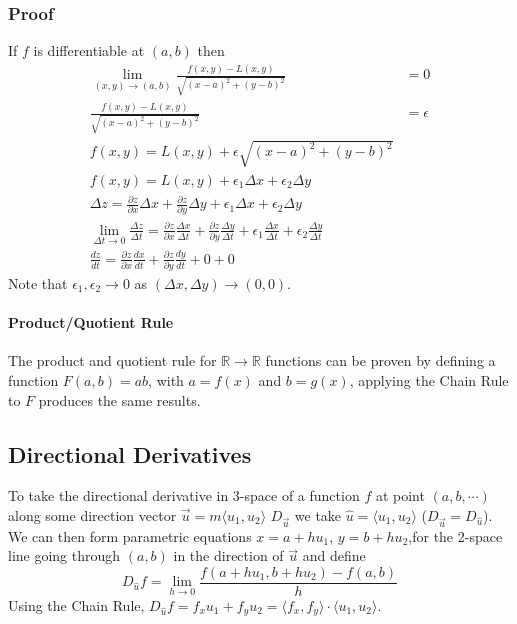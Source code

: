 \documentclass{article}
\newcommand{\vect}[1]{\ensuremath{\overrightarrow{#1}}}
\begin{document}
\subsubsection{Proof}
If $f$ is differentiable at $(a,b)$ then
\begin{align*}
    \lim_{(x,y)\to(a,b)} \frac{f(x,y)-L(x,y)}{\sqrt{(x-a)^2+(y-b)^2}}&=0\\
    \frac{f(x,y)-L(x,y)}{\sqrt{(x-a)^2+(y-b)^2}}&=\epsilon\\
    f(x,y) = L(x,y) + \epsilon\sqrt{(x-a)^2+(y-b)^2}\\
    f(x,y) = L(x,y) + \epsilon_1\Delta{x} + \epsilon_2\Delta{y} \\
    \Delta{z} = \frac{\partial{z}}{\partial{x}}\Delta{x} + \frac{\partial{z}}{\partial{y}}\Delta{y} + \epsilon_1\Delta{x} + \epsilon_2\Delta{y}\\
    \lim_{\Delta{t}\to0} \frac{\Delta{z}}{\Delta{t}} = \frac{\partial{z}}{\partial{x}}\frac{\Delta{x}}{\Delta{t}} + \frac{\partial{z}}{\partial{y}}\frac{\Delta{y}}{\Delta{t}} + \epsilon_1\frac{\Delta{x}}{\Delta{t}} + \epsilon_2\frac{\Delta{y}}{\Delta{t}}\\
    \frac{dz}{dt}=\frac{\partial z}{\partial x}\frac{dx}{dt}+\frac{\partial z}{\partial y}\frac{dy}{dt}+0+0
\end{align*}
Note that $\epsilon_1, \epsilon_2\to0$ as $(\Delta{x},\Delta{y})\to(0,0)$.

\paragraph{Product/Quotient Rule} The product and quotient rule for $\mathbb{R}\to\mathbb{R}$ functions can be proven by defining a function $F(a,b)=ab$, with $a=f(x)$ and $b=g(x)$, applying the Chain Rule to $F$ produces the same results.

\subsection{Directional Derivatives}
To take the directional derivative in 3-space of a function $f$ at point $(a,b,\cdots)$ along some direction vector $\vect{u}=m\langle u_1, u_2\rangle$ $D_{\vect{u}}$ we take $\hat{u}=\langle u_1, u_2\rangle$ ($D_{\vect{u}} = D_{\hat{u}}$). We can then form parametric equations $x=a+hu_1$, $y=b+hu_2$,for the 2-space line going through $(a,b)$ in the direction of \vect{u} and define
$$D_{\hat{u}}f=\lim_{h\to0}\frac{f(a+hu_1,b+hu_2)-f(a,b)}{h}$$
Using the Chain Rule, $D_{\hat{u}}f = f_xu_1+f_yu_2=\langle f_x, f_y \rangle \cdot \langle u_1, u_2 \rangle$.
\end{document}

